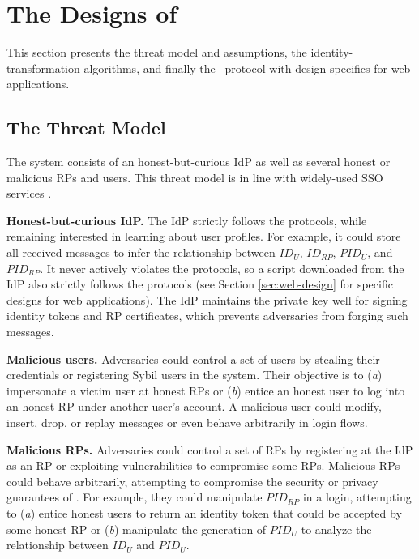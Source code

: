\section{The Designs of \usso}
\label{sec:UPPRESSO}

This section presents the threat model and assumptions, the identity-transformation algorithms, and finally the \usso\ protocol with design specifics for web applications.

\subsection{The Threat Model}
\label{subsec:threatmodel}
The system consists of an honest-but-curious IdP as well as several honest or malicious RPs and users. %
This threat model is in line with widely-used SSO services \cite{OpenIDConnect,rfc6749, SAML, SAMLIdentifier}.

\noindent \textbf{Honest-but-curious IdP.} The IdP strictly follows the protocols,
 while remaining interested in learning about user profiles.
For example, it could store all received messages to infer the relationship between $ID_U$, $ID_{RP}$, $PID_{U}$, and $PID_{RP}$.
It never actively violates the protocols, so a script downloaded from the IdP also strictly follows the protocols (see Section \ref{sec:web-design} for specific designs for web applications).
The IdP maintains the private key well for signing identity tokens and RP certificates, %
which prevents adversaries from forging such messages.

\noindent \textbf{Malicious users.} Adversaries could control a set of users by stealing their credentials or registering Sybil users in the system.
 Their objective \cite{SPRESSO, FettKS14} is to (\emph{a}) impersonate a victim user at honest RPs or (\emph{b}) entice an honest user to log into an honest RP under another user's account.
A malicious user could modify, insert, drop, or replay messages or even behave arbitrarily in login flows.

\noindent \textbf{Malicious RPs.}
Adversaries could control a set of RPs by registering at the IdP as an RP or exploiting vulnerabilities to compromise some RPs.
Malicious RPs could behave arbitrarily, attempting to compromise the security or privacy guarantees of \usso.
For example, they could manipulate $PID_{RP}$ in a login, attempting to (\emph{a}) entice honest users to return an identity token that could be accepted by some honest RP or (\emph{b}) manipulate the generation of $PID_U$ to analyze the relationship between $ID_U$ and $PID_U$.

